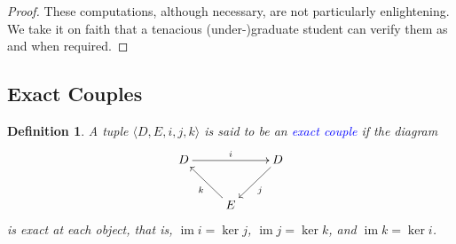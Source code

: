 \documentclass[11pt]{article}
\theoremstyle{thmstyle}
\theoremstyle{defstyle}
\newtheorem{definition}[theorem]{Definition}
\newcommand{\im}{\operatorname{im}}
\newcommand{\define}[1]{\textcolor{blue}{\textit{#1}}}
\begin{document}
\begin{proof}

    These computations, although necessary, are not particularly enlightening. We take it on faith that a tenacious (under-)graduate student can verify them as and when required. 
\end{proof}

\subsection*{Exact Couples}

\begin{definition}
    A tuple $\langle D, E, i, j, k\rangle$ is said to be an \define{exact couple} if the diagram 
    \begin{equation*}
        \xymatrix {
            D\ar[rr]^i &  & D\ar[ld]^j\\
            & E\ar[lu]^k & 
        }
    \end{equation*}
    is exact at each object, that is, $\im i = \ker j$, $\im j = \ker k$, and $\im k = \ker i$.
\end{definition}
\end{document}
